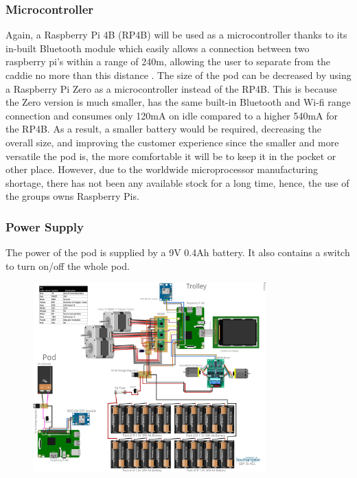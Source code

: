 \documentclass[11pt,landscape]{article}
\begin{document}
\begin{multicols}{3}
\subsubsection{Microcontroller}
Again, a Raspberry Pi 4B (RP4B) will be used as a microcontroller thanks to its
in-built Bluetooth module which easily allows a connection between two raspberry
pi’s within a range of 240m, allowing the user to separate from the caddie no
more than this distance \cite{raspi}.
The size of the pod can be decreased by using a Raspberry Pi Zero as a
microcontroller instead of the RP4B. This is because the Zero version is much
smaller, has the same built-in Bluetooth and Wi-fi range connection and consumes
only 120mA on idle compared to a higher 540mA for the RP4B. As a result, a
smaller battery would be required, decreasing the overall size, and improving
the customer experience since the smaller and more versatile the pod is, the
more comfortable it will be to keep it in the pocket or other place. However,
due to the worldwide microprocessor manufacturing shortage, there has not been
any available stock for a long time, hence, the use of the groups owns Raspberry
Pis. 

\subsubsection{Power Supply}
The power of the pod is supplied by a 9V 0.4Ah battery. It also contains a
switch to turn on/off the whole pod.

\end{multicols}

\begin{figure}[H]
    \begin{center}
    \includegraphics[width=0.8\textwidth]{electrical_schematic.png}
    \label{fig:electrical_schematic}
    \end{center}
\end{figure}
\end{document}

